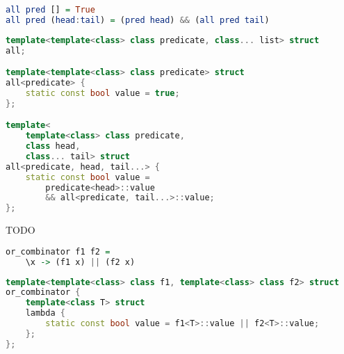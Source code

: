 \documentclass{article}
\begin{document}
\begin{center}
\begin{comment}
Higher-Order Functions Operating on Lists
Once you combine higher-order functions with lists you have a powerful functional language at your disposal. Higher-order functions operating on lists look very much like algorithms. Let me show you some classic examples. Here’s the function (or algorithm), all, that returns true if and only if all elements of a list satisfy a given predicate.
\end{comment}
\begin{lstlisting}[language=Haskell]
all pred [] = True
all pred (head:tail) = (pred head) && (all pred tail)
\end{lstlisting}
\Bigg\Downarrow
\begin{lstlisting}[language=C++]
template<template<class> class predicate, class... list> struct
all;

template<template<class> class predicate> struct
all<predicate> {
    static const bool value = true;
};

template<
    template<class> class predicate, 
    class head, 
    class... tail> struct
all<predicate, head, tail...> {
    static const bool value = 
        predicate<head>::value 
        && all<predicate, tail...>::value;
};
\end{lstlisting}
\end{center}
TODO
\begin{center}
\begin{comment}
Let’s start with a Haskell example. I want to define a function that takes two predicate functions and returns another predicate function that combines the two using logical OR. Here it is in Haskell: <lenti Haskell kód>. The or_combinator returns an anonymous function (the famous “lambda”) that takes one argument, x, calls both f1 and f2 with it, and returns the logical OR of the two results. The return value of or_combinator is this freshly constructed function. I can then call this function with an arbitrary argument. For instance, here I’m checking if 2 is either zero or one (guess what, it isn’t!):
(or_combinator is_zero is_one) 2
\end{comment}
\begin{lstlisting}[language=Haskell]
or_combinator f1 f2 = 
    \x -> (f1 x) || (f2 x)
\end{lstlisting}
\Bigg\Downarrow
\begin{lstlisting}[language=C++]
template<template<class> class f1, template<class> class f2> struct
or_combinator {
    template<class T> struct
    lambda {
        static const bool value = f1<T>::value || f2<T>::value;
    };
};
\end{lstlisting}
\end{center}
\end{document}
